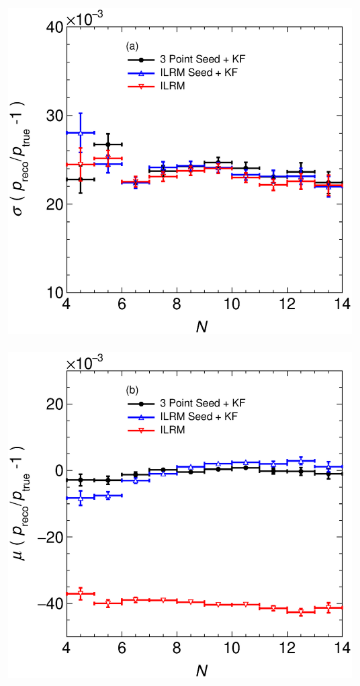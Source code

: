 \begin{figure}[t]
     \centering
     \begin{subfigure}[b]{0.48\textwidth}
         \centering
         \includegraphics[width=\textwidth]{figures/ch4-KF_NDGArLite/MC/RespVSN.eps}
         \caption{}
         \label{fig:MCResPVSN_GArLite_Res}
     \end{subfigure}
     \begin{subfigure}[b]{0.48\textwidth}
         \centering
         \includegraphics[width=\textwidth]{figures/ch4-KF_NDGArLite/MC/BiaspVSN.eps}

\end{subfigure}
\end{figure}
